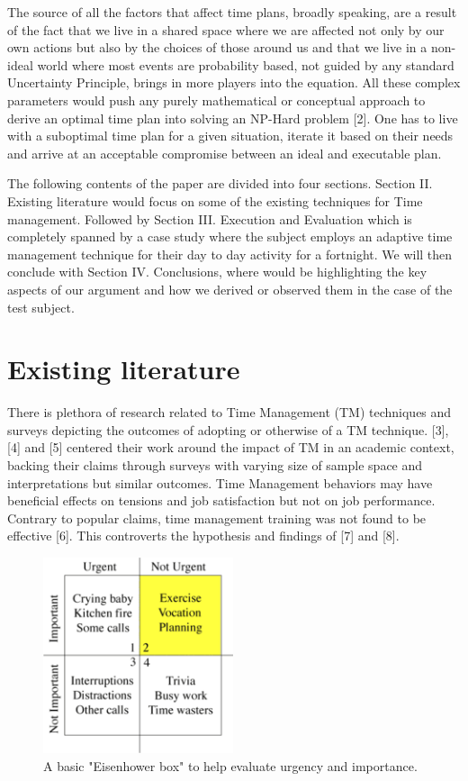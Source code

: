\documentclass[conference]{IEEEtran}
\begin{document}
The source of all the factors that affect time plans, broadly speaking, are a result of the fact that we live in a shared space where we are affected not only by our own actions but also by the choices of those around us and that we live in a non-ideal world where most events are probability based, not guided by any standard Uncertainty Principle, brings in more players into the equation. All these complex parameters would push any purely mathematical or conceptual approach to derive an optimal time plan into solving an NP-Hard problem [2]. One has to live with a suboptimal time plan for a given situation, iterate it based on their needs and arrive at an acceptable compromise between an ideal and executable plan.

The following contents of the paper are divided into four sections. Section II. Existing literature would focus on some of the existing techniques for Time management. Followed by Section III. Execution and Evaluation which is completely spanned by a case study where the subject employs an adaptive time management technique for their day to day activity for a fortnight. We will then conclude with Section IV. Conclusions, where would be highlighting the key aspects of our argument and how we derived or observed them in the case of the test subject.

\section{Existing literature}
There is plethora of research related to Time Management (TM) techniques and surveys depicting the outcomes of adopting or otherwise of a TM technique. [3], [4] and [5] centered their work around the impact of TM in an academic context, backing their claims through surveys with varying size of sample space and interpretations but similar outcomes. Time Management behaviors may have beneficial effects on tensions and job satisfaction but not on job performance. Contrary to popular claims, time management training was not found to be effective [6]. This controverts the hypothesis and findings of [7] and [8].

\begin{figure}[hb]
  \centering
  \includegraphics[width=2.2in]{eisenhower}
  \caption[]
   {A basic "Eisenhower box" to help evaluate urgency and importance.}
\end{figure}
\end{document}
